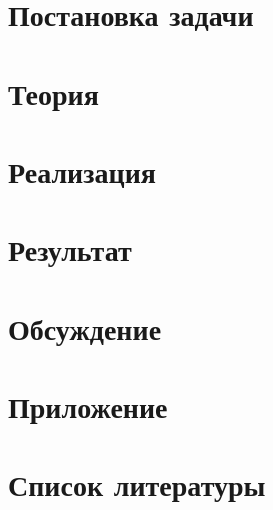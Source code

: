 \documentclass[a4paper,12pt]{article} %
\begin{document}
	
	\tableofcontents
	\listoffigures
	\listoftables
	\newpage
	\section{Постановка задачи}
	
	\newpage
	\section{Теория}
	
	\newpage
	\section{Реализация}
	
	\newpage
	\section{Результат}
	
	\newpage
	\section{Обсуждение}
	
	\newpage
	\section{Приложение}
	
	\newpage
	\section{Список литературы}
	
\end{document}
